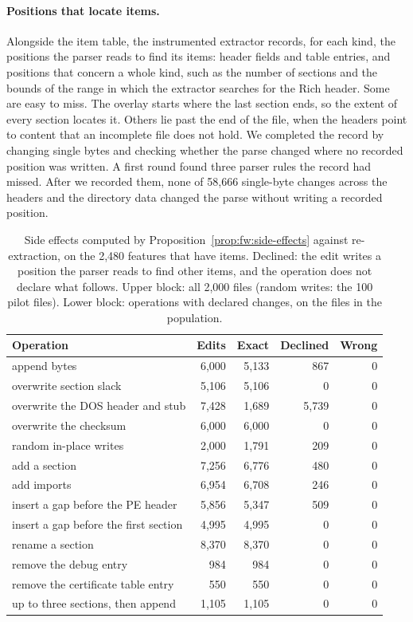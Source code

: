 \paragraph{Positions that locate items.} Alongside the item table, the instrumented extractor records, for each kind,
the positions the parser reads to find its items: header fields and table entries, and positions that concern a whole kind, such as the number of sections and
the bounds of the range in which the extractor searches for the Rich header. Some are easy to miss. The overlay starts
where the last section ends, so the extent of every section locates it. Others lie
past the end of the file, when the headers point to content that an incomplete file does not hold. We
completed the record by changing single bytes and checking whether the parse changed where no recorded position was
written. A first round found three parser rules the record had missed. After we recorded them, none of 58,666
single-byte changes across the headers and the directory data changed the parse without writing a recorded position.

\begin{table}[t]
  \caption{Side effects computed by Proposition~\ref{prop:fw:side-effects} against re-extraction, on the 2,480
  features that have items. Declined: the edit writes a position the parser reads to find other items, and the
  operation does not declare what follows. Upper block: all 2,000 files (random writes: the 100 pilot files). Lower
  block: operations with declared changes, on the files in the population.}
  \label{tab:ember:side-effects}
  \small
  \begin{tabular}{@{}lrrrr@{}}
    \toprule
    Operation & Edits & Exact & Declined & Wrong \\
    \midrule
    append bytes & 6,000 & 5,133 & 867 & 0 \\
    overwrite section slack & 5,106 & 5,106 & 0 & 0 \\
    overwrite the DOS header and stub & 7,428 & 1,689 & 5,739 & 0 \\
    overwrite the checksum & 6,000 & 6,000 & 0 & 0 \\
    random in-place writes & 2,000 & 1,791 & 209 & 0 \\
    \midrule
    add a section & 7,256 & 6,776 & 480 & 0 \\
    add imports & 6,954 & 6,708 & 246 & 0 \\
    insert a gap before the PE header & 5,856 & 5,347 & 509 & 0 \\
    insert a gap before the first section & 4,995 & 4,995 & 0 & 0 \\
    rename a section & 8,370 & 8,370 & 0 & 0 \\
    remove the debug entry & 984 & 984 & 0 & 0 \\
    remove the certificate table entry & 550 & 550 & 0 & 0 \\
    up to three sections, then append & 1,105 & 1,105 & 0 & 0 \\
    \bottomrule
  \end{tabular}
\end{table}

